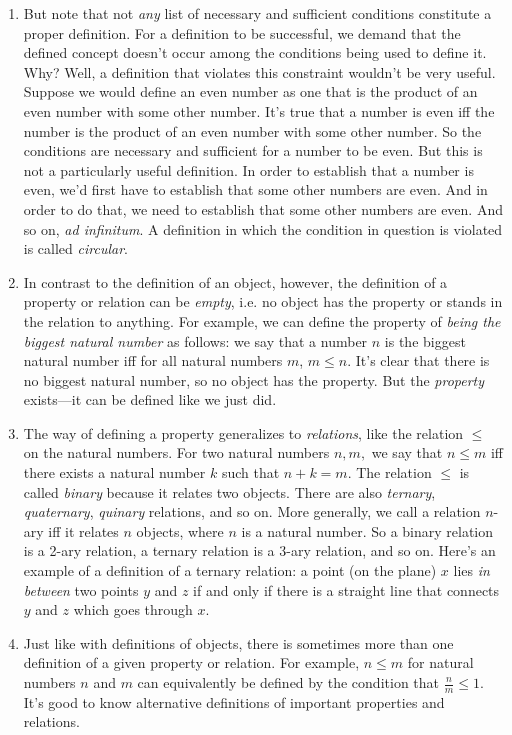 \begin{enumerate}[{\thesection}.1]
		\item But note that not \emph{any} list of necessary and sufficient conditions constitute a proper definition. For a definition to be successful, we demand that the defined concept doesn't occur among the conditions being used to define it. Why? Well, a definition that violates this constraint wouldn't be very useful. Suppose we would define an even number as one that is the product of an even number with some other number. It's true that a number is even iff the number is the product of an even number with some other number. So the conditions are necessary and sufficient for a number to be even. But this is not a particularly useful definition. In order to establish that a number is even, we'd first have to establish that some other numbers are even. And in order to do that, we need to establish that some other numbers are even. And so on, \emph{ad infinitum}. A definition in which the condition in question is violated is called \emph{circular}.
		
		\item In contrast to the definition of an object, however, the definition of a property or relation can be \emph{empty}, i.e. no object has the property or stands in the relation to anything. For example, we can define the property of \emph{being the biggest natural number} as follows: we say that a number $n$ is the biggest natural number iff for all natural numbers $m$, $m\leq n$. It's clear that there is no biggest natural number, so no object has the property. But the \emph{property} exists---it can be defined like we just did.
				
		\item The way of defining a property generalizes to \emph{relations}, like the relation $\leq$ on the natural numbers. For two natural numbers $n,m,$ we say that $n\leq m$ iff there exists a natural number $k$ such that $n+k=m$. The relation $\leq$ is called \emph{binary} because it relates two objects. There are also \emph{ternary}, \emph{quaternary}, \emph{quinary} relations, and so on. More generally, we call a relation $n$-ary iff it relates $n$ objects, where $n$ is a natural number. So a binary relation is a 2-ary relation, a ternary relation is a 3-ary relation, and so on. Here's an example of a definition of a ternary relation: a point (on the plane) $x$ lies \emph{in between} two points $y$ and $z$ if and only if there is a straight line that connects $y$ and $z$ which goes through $x$.
		
		\item Just like with definitions of objects, there is sometimes more than one definition of a given property or relation. For example, $n\leq m$ for natural numbers $n$ and $m$ can equivalently be defined by the condition that $\frac{n}{m}\leq 1$. It's good to know alternative definitions of important properties and relations.
		

\end{enumerate}

